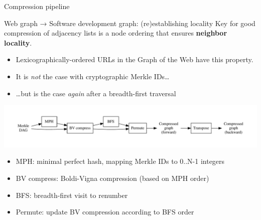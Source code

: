 \documentclass[aspectratio=169,xcolor=table]{beamer}
\begin{document}
\begin{frame}{Compression pipeline}
        \begin{block}{Web graph → Software development graph: (re)establishing locality}
            Key for good compression of adjacency lists is a \alert{node
            ordering} that ensures \textbf{neighbor locality}.
            \begin{itemize}
                \item Lexicographically-ordered URLs in the Graph of the Web
                    have this property.
                \item It is \emph{not} the case with cryptographic Merkle
                    IDs\ldots{}
                \item \ldots{}but is the case \emph{again} after a
                    breadth-first traversal
            \end{itemize}
        \end{block}
        \vspace{-0.7cm}
        \begin{center}
            \includegraphics[width=1\linewidth]{../img/compression/compression_steps-nofiles}
        \end{center}
        \vspace{-1cm}
        \begin{itemize}
            \item \alert{MPH:} minimal perfect hash, mapping Merkle IDs to 0..N-1 integers
            \item \alert{BV compress:} Boldi-Vigna compression (based on MPH order)
            \item \alert{BFS:} breadth-first visit to renumber
            \item \alert{Permute:} update BV compression according to BFS order
        \end{itemize}
    \end{frame}
\end{document}

